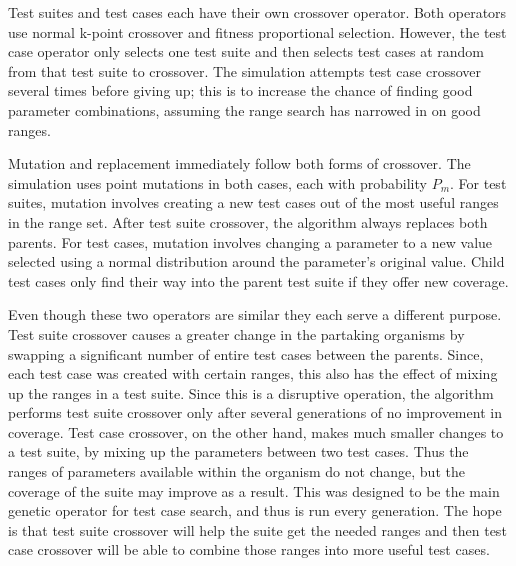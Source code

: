 \documentclass[runningheads]{llncs}
\begin{document}
Test suites and test cases each have their own crossover operator. Both operators use normal k-point crossover and fitness proportional selection. However, the test case operator only selects one test suite and then selects test cases at random from that test suite to crossover. The simulation attempts test case crossover several times before giving up; this is to increase the chance of finding good parameter combinations, assuming the range search has narrowed in on good ranges.

Mutation and replacement immediately follow both forms of crossover. The simulation uses point mutations in both cases, each with probability $P_m$. For test suites, mutation involves creating a new test cases out of the most useful ranges in the range set. After test suite crossover, the algorithm always replaces both parents. For test cases, mutation involves changing a parameter to a new value selected using a normal distribution around the parameter's original value. Child test cases only find their way into the parent test suite if they offer new coverage. 

Even though these two operators are similar they each serve a different purpose. Test suite crossover causes a greater change in the partaking organisms by swapping a significant number of entire test cases between the parents. Since, each test case was created with certain ranges, this also has the effect of mixing up the ranges in a test suite. Since this is a disruptive operation, the algorithm performs test suite crossover only after several generations of no improvement in coverage. Test case crossover, on the other hand, makes much smaller changes to a test suite, by mixing up the parameters between two test cases. Thus the ranges of parameters available within the organism do not change, but the coverage of the suite may improve as a result. This was designed to be the main genetic operator for test case search, and thus is run every generation. The hope is that test suite crossover will help the suite get the needed ranges and then test case crossover will be able to combine those ranges into more useful test cases.
\end{document}

